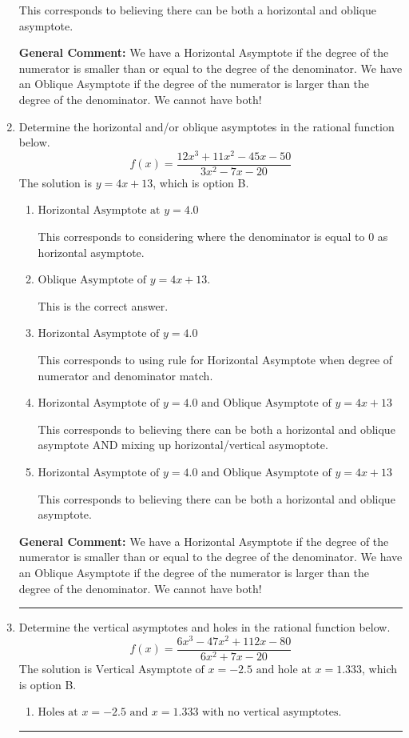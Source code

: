 \documentclass{extbook}[14pt]
\newcommand{\litem}[1]{\item #1

\rule{\textwidth}{0.4pt}}
\begin{document}
\begin{enumerate}
{\begin{enumerate}[label=\Alph*.]
This corresponds to believing there can be both a horizontal and oblique asymptote.
\end{enumerate}

\textbf{General Comment:} We have a Horizontal Asymptote if the degree of the numerator is smaller than or equal to the degree of the denominator. We have an Oblique Asymptote if the degree of the numerator is larger than the degree of the denominator. We cannot have both!
}
\litem{
Determine the horizontal and/or oblique asymptotes in the rational function below.
\[ f(x) = \frac{12x^{3} +11 x^{2} -45 x -50}{3x^{2} -7 x -20} \]The solution is \( y = 4x + 13 \), which is option B.\begin{enumerate}[label=\Alph*.]
\item \( \text{Horizontal Asymptote at } y = 4.0 \)

This corresponds to considering where the denominator is equal to 0 as horizontal asymptote.
\item \( \text{Oblique Asymptote of } y = 4x + 13. \)

This is the correct answer.
\item \( \text{Horizontal Asymptote of } y = 4.0  \)

This corresponds to using rule for Horizontal Asymptote when degree of numerator and denominator match.
\item \( \text{Horizontal Asymptote of } y = 4.0 \text{ and Oblique Asymptote of } y = 4x + 13 \)

This corresponds to believing there can be both a horizontal and oblique asymptote AND mixing up horizontal/vertical asymoptote.
\item \( \text{Horizontal Asymptote of } y = 4.0 \text{ and Oblique Asymptote of } y = 4x + 13 \)

This corresponds to believing there can be both a horizontal and oblique asymptote.
\end{enumerate}

\textbf{General Comment:} We have a Horizontal Asymptote if the degree of the numerator is smaller than or equal to the degree of the denominator. We have an Oblique Asymptote if the degree of the numerator is larger than the degree of the denominator. We cannot have both!
}
\litem{
Determine the vertical asymptotes and holes in the rational function below.
\[ f(x) = \frac{6x^{3} -47 x^{2} +112 x -80}{6x^{2} +7 x -20} \]The solution is \( \text{Vertical Asymptote of } x = -2.5 \text{ and hole at } x = 1.333 \), which is option B.\begin{enumerate}[label=\Alph*.]
\item \( \text{Holes at } x = -2.5 \text{ and } x = 1.333 \text{ with no vertical asymptotes.} \)


\end{enumerate}}
\end{enumerate}
\end{document}
